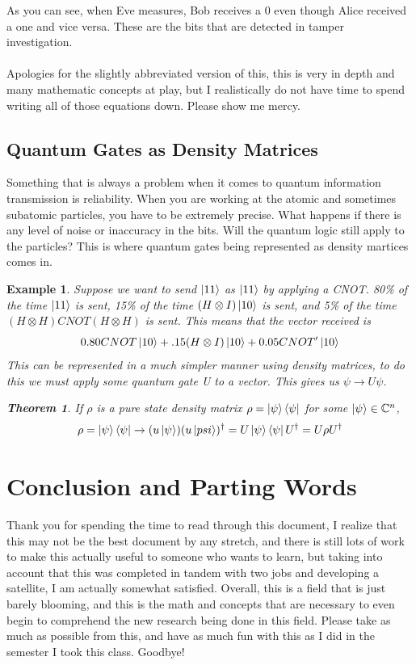 \documentclass[12pt]{article}
\theoremstyle{plain}
\newtheorem{theorem}[lemma]{Theorem}
\theoremstyle{nonumberplain}
\theoremstyle{plain}
\newtheorem{example}[lemma]{Example}
\theoremstyle{nonumberplain}
\newcommand\1{{\bf 1}}
\newcommand{\C}{\mathbb{C}} %
\newcommand{\<}{\left\langle}
\renewcommand{\>}{\right\rangle}
\begin{document}
As you can see, when Eve measures, Bob receives a 0 even though Alice received a one and vice versa.  These are the bits that are detected in tamper investigation.  \\
\\
Apologies for the slightly abbreviated version of this, this is very in depth and many mathematic concepts at play, but I realistically do not have time to spend writing all of those equations down. Please show me mercy.    

\pagebreak

\subsection{Quantum Gates as Density Matrices}
Something that is always a problem when it comes to quantum information transmission is reliability.  When you are working at the atomic and sometimes subatomic particles, you have to be extremely precise.  What happens if there is any level of noise or inaccuracy in the bits.  Will the quantum logic still apply to the particles?  This is where quantum gates being represented as density martices comes in.  
\begin{example}
Suppose we want to send $\ket{11}$ as $\ket{11}$ by applying a CNOT.  80\% of the time $\ket{11}$ is sent, 15\% of the time $(H \otimes I) \ket{10}$ is sent, and 5\% of the time $(H \otimes H)CNOT(H \otimes H)$ is sent.  This means that the vector received is
\begin{equation}
0.80CNOT\ket{10} + .15(H \otimes I)\ket{10} + 0.05 CNOT' \ket{10} 
\end{equation}
This can be represented in a much simpler manner using density matrices, to do this we must apply some quantum gate U to a vector.  This gives us $\psi \rightarrow U\psi$.
\begin{theorem} If $\rho$ is a pure state density matrix $\rho = \ket{\psi}\bra{\psi}$ for some $\ket{\psi} \in \C^n$, 
\begin{equation}
\rho = \ket{\psi}\bra{\psi} \rightarrow (u\ket{\psi})(u\ket{psi})^\dagger = U\ket{\psi}\bra{\psi}U^\dagger = U\rho U^\dagger
\end{equation}
\end{theorem}
\end{example}
\pagebreak

\section{Conclusion and Parting Words}
Thank you for spending the time to read through this document, I realize that this may not be the best document by any stretch, and there is still lots of work to make this actually useful to someone who wants to learn, but taking into account that this was completed in tandem with two jobs and developing a satellite, I am actually somewhat satisfied.  Overall, this is a field that is just barely blooming, and this is the math and concepts that are necessary to even begin to comprehend the new research being done in this field.  Please take as much as possible from this, and have as much fun with this as I did in the semester I took this class.  Goodbye! 
\end{document}
